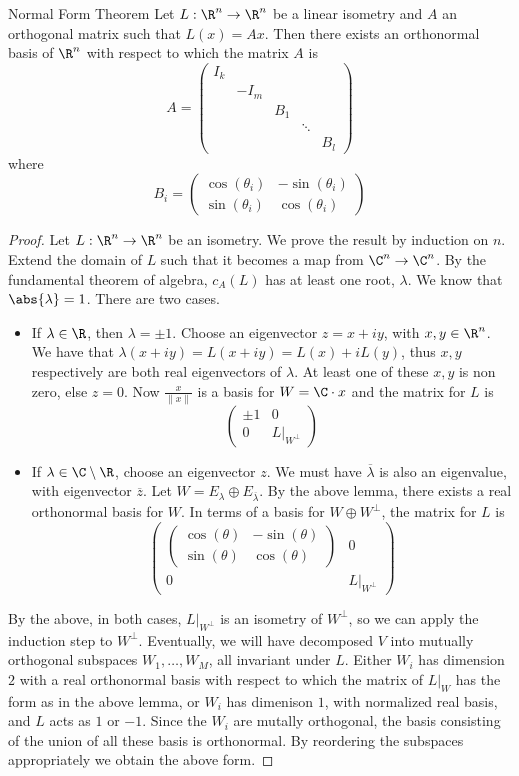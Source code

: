\begin{thm}{Normal Form Theorem}{} Let $L:\R^n\to\R^n$ be a linear isometry and $A$ an orthogonal matrix such that $L(x)=Ax$. Then there exists an orthonormal basis of $\R^n$ with respect to which the matrix $A$ is $$A=\begin{pmatrix}
I_k &&&&\\
&-I_m&&&\\
&&B_1&&\\
&&&\ddots&\\
&&&&B_l
\end{pmatrix}$$ where $$B_i=\begin{pmatrix}\cos(\theta_i) & -\sin(\theta_i) \\
\sin(\theta_i) & \cos(\theta_i)
\end{pmatrix}$$\tcbline
\begin{proof}
Let $L:\R^n\to\R^n$ be an isometry. We prove the result by induction on $n$. Extend the domain of $L$ such that it becomes a map from $\C^n\to\C^n$. By the fundamental theorem of algebra, $c_A(L)$ has at least one root, $\lambda$. We know that $\abs{\lambda}=1$. There are two cases. 
\begin{itemize}
\item If $\lambda\in\R$, then $\lambda=\pm1$. Choose an eigenvector $z=x+iy$, with $x,y\in\R^n$. We have that $\lambda(x+iy)=L(x+iy)=L(x)+iL(y)$, thus $x,y$ respectively are both real eigenvectors of $\lambda$. At least one of these $x,y$ is non zero, else $z=0$. Now $\frac{x}{\|x\|}$ is a basis for $W=\C\cdot x$ and the matrix for $L$ is $$\begin{pmatrix}
\pm1 & 0\\
0 & L|_{W^\perp}
\end{pmatrix}$$
\item If $\lambda\in\C\setminus\R$, choose an eigenvector $z$. We must have $\overline{\lambda}$ is also an eigenvalue, with eigenvector $\overline{z}$. Let $W=E_{\lambda}\oplus E_{\overline{\lambda}}$. By the above lemma, there exists a real orthonormal basis for $W$. In terms of a basis for $W\oplus W^\perp$, the matrix for $L$ is $$\begin{pmatrix}
\begin{pmatrix}
\cos(\theta) & -\sin(\theta) \\
\sin(\theta) & \cos(\theta)
\end{pmatrix} & 0\\
0 & L|_{W^\perp}
\end{pmatrix}$$
\end{itemize}
By the above, in both cases, $L|_{W^\perp}$ is an isometry of $W^\perp$, so we can apply the induction step to $W^\perp$. Eventually, we will have decomposed $V$ into mutually orthogonal subspaces $W_1,\dots,W_M$, all invariant under $L$. Either $W_i$ has dimension $2$ with a real orthonormal basis with respect to which the matrix of $L|_W$ has the form as in the above lemma, or $W_i$ has dimenison $1$, with normalized real basis, and $L$ acts as $1$ or $-1$. Since the $W_i$ are mutally orthogonal, the basis consisting of the union of all these basis is orthonormal. By reordering the subspaces appropriately we obtain the above form. 
\end{proof}
\end{thm}

